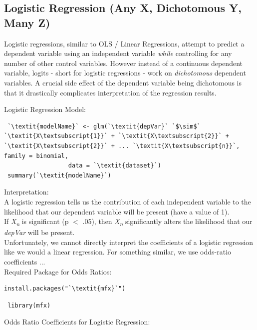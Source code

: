 \documentclass[12pt,letterpaper]{article}
\newcommand{\ind}{\phantom{AA}}
\begin{document}
\subsection{Logistic Regression (Any X, Dichotomous Y, Many Z)}
Logistic regressions, similar to OLS / Linear Regressions, attempt to predict a dependent variable using an independent variable \textit{while} controlling for any number of other control variables. However instead of a continuous dependent variable, logits - short for logistic regressions - work on \textit{dichotomous} dependent variables. A crucial side effect of the dependent variable being dichotomous is that it drastically complicates interpretation of the regression results.
\begin{tcolorbox}[title = Logistic Regression]
 Logistic Regression Model:
\begin{lstlisting}
 `\textit{modelName}` <- glm(`\textit{depVar}` `$\sim$` `\textit{X\textsubscript{1}}` + `\textit{X\textsubscript{2}}` + `\textit{X\textsubscript{2}}` + ... `\textit{X\textsubscript{n}}`, family = binomial, 
                  data = `\textit{dataset}`) 
 summary(`\textit{modelName}`)
\end{lstlisting}
Interpretation:\\
\ind A logistic regression tells us the contribution of each independent variable to the\\ \ind \ind likelihood that our dependent variable will be present (have a value of 1).\\
\ind If \textit{X\textsubscript{n}} is significant (p $<$ .05), then \textit{X\textsubscript{n}} significantly alters the likelihood that our\\ \ind \ind \textit{depVar} will be present.\\
\ind Unfortunately, we cannot directly interpret the coefficients of a logistic regression\\ \ind \ind like we would a linear regression. For something similar, we use odds-ratio\\ \ind \ind coefficients ...
\vspace{.5em}\\
Required Package for Odds Ratios:
\begin{lstlisting}[frameround = t t t t, backgroundcolor = \color{lightgray}]
  install.packages("`\textit{mfx}`")
\end{lstlisting}
\begin{lstlisting}
 library(mfx)
\end{lstlisting}
Odds Ratio Coefficients for Logistic Regression:

\end{tcolorbox}
\end{document}
